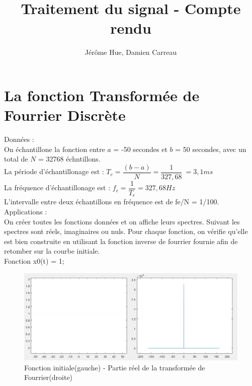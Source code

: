 \documentclass[10pt,a4paper]{article}
\author{Jérôme Hue, Damien Carreau}
\title{Traitement du signal - Compte rendu}
\begin{document}
\maketitle
\section{La fonction Transformée de Fourrier Discrète}
\noindent
Données : \\
On échantillone la fonction entre $a$  = -50 secondes et $b$ = 50 secondes, avec un total de $N$ = 32768 échntillons.\\
La période d'échantillonage est : \( T_e = \dfrac{(b-a)}{N} = \dfrac{1}{327,68} \ = 3,1 ms \)  \\
La fréquence d'échantillonage est : \( f_e = \dfrac{1}{T_e} = 327,68 Hz \) \\
L'intervalle entre deux échantillons en fréquence est de fe/N = 1/100.\\

\noindent
Applications : \\
On créer toutes les fonctions données et on affiche leurs spectres. Suivant les spectres sont réels, imaginaires ou nuls.
Pour chaque fonction, on vérifie qu'elle est bien construite en utilisant la fonction inverse de fourrier fournie afin de retomber sur la courbe initiale.\\

Fonction x0(t) = 1;
\begin{figure}[h]
\begin{center}
\includegraphics[scale=0.7]{x0.png}
\caption{Fonction initiale(gauche) - Partie réel de la transformée de Fourrier(droite)}
\end{center}
\end{figure} \\
\end{document}
